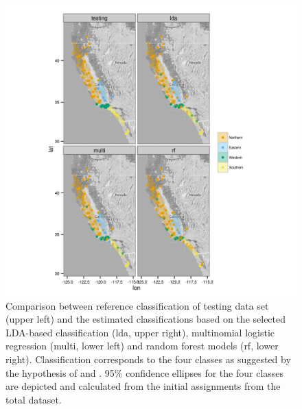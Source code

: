 \documentclass[12pt,letterpaper]{article}\usepackage{graphicx, color}
\begin{document}
\begin{figure}[ht]
  \centering
  \includegraphics[width = \textwidth]{figure/gen_map}
  \caption{Comparison between reference classification of testing data set (upper left) and the estimated classifications based on the selected LDA-based classification (lda, upper right), multinomial logistic regression (multi, lower left) and random forest models (rf, lower right). Classification corresponds to the four classes as suggested by the hypothesis of \citet{Spinks2005} and \citet{Spinks2010}. 95\% confidence ellipses for the four classes are depicted and calculated from the initial assignments from the total dataset.}
  \label{fig:gen_map}
\end{figure}
\end{document}
